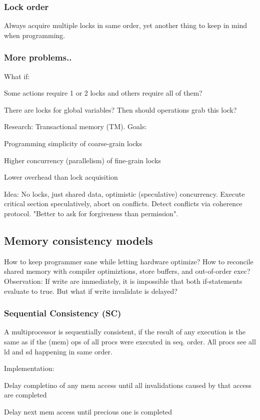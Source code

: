 \documentclass[a4paper, fontsize=8pt, landscape, DIV=1]{scrartcl}
\makeatletter
\renewenvironment{outline}[1][]{%
  \ifthenelse{\equal{#1}{}}{}{\renewcommand{\ol@type}{#1}}%
  \ol@z%
  \newcommand{\0}{\ol@toz\ol@z}%
  \newcommand{\1}{\vspace{\dimexpr\outlinespacingscalar\baselineskip-\baselineskip}\ol@toi\ol@i\item}%
  \newcommand{\2}{\vspace{\dimexpr\outlinespacingscalartwo\baselineskip-\baselineskip}\ol@toii\ol@ii\item}%
  \newcommand{\3}{\vspace{\dimexpr\outlinespacingscalar\baselineskip-\baselineskip}\ol@toiii\ol@iii\item}%
  \newcommand{\4}{\vspace{\dimexpr\outlinespacingscalar\baselineskip-\baselineskip}\ol@toiiii\ol@iiii\item}%
}{%
  \ol@toz\ol@exit%
}
\def\outlinespacingscalar{0.5}
\def\outlinespacingscalartwo{0.5}
\makeatother
\begin{document}
\begin{multicols*}{4}
  \subsubsection{Lock order}
  Always acquire multiple locks in same order, yet another thing to keep in mind when
  programming.

  \subsubsection{More problems..}
  What if:
  \begin{outline}
    \1 Some actions require 1 or 2 locks and others require all of them?
    \1 There are locks for global variables? Then should operations grab this lock?
  \end{outline}

  Research: Transactional memory (TM). Goals:
  \begin{outline}
    \1 Programming simplicity of coarse-grain locks
    \1 Higher concurrency (parallelism) of fine-grain locks
    \1 Lower overhead than lock acquisition
  \end{outline}

  Idea: No locks, just shared data, optimistic (speculative) concurrency. Execute
  critical section speculatively, abort on conflicts. Detect conflicts via coherence protocol.
  "Better to ask for forgiveness than permission".

  \subsection{Memory consistency models}
  How to keep programmer sane while letting hardware optimize? How to reconcile
  shared memory with compiler optimiztions, store buffers, and out-of-order exec?
  Observation: If write are immediately, it is impossible that both if-statements 
  evaluate to true. But what if write invalidate is delayed?

  \subsubsection{Sequential Consistency (SC)}
  A multiprocessor is sequentially consistent, if the result of any execution is the same
  as if the (mem) ops of all procs were executed in seq. order. All procs see all ld and sd
  happening in same order.

  Implementation:
  \begin{outline}
    \1 Delay completino of any mem access until all invalidations caused by that access
    are completed
    \1 Delay next mem access until precious one is completed
  \end{outline}


\end{multicols*}
\end{document}
